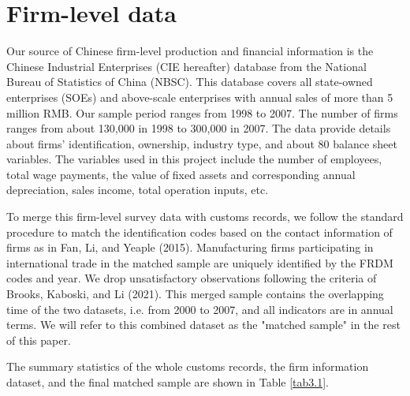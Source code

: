 \section{Firm-level data}

Our source of Chinese firm-level production and financial information is the Chinese Industrial Enterprises (CIE hereafter) database from the National Bureau of Statistics of China (NBSC). This database covers all state-owned enterprises (SOEs) and above-scale enterprises with annual sales of more than 5 million RMB. Our sample period ranges from 1998 to 2007. The number of firms ranges from about 130,000 in 1998 to 300,000 in 2007. The data provide details about firms’ identification, ownership, industry type, and about 80 balance sheet variables. The variables used in this project include the number of employees, total wage payments, the value of fixed assets and corresponding annual depreciation, sales income, total operation inputs, etc. 

To merge this firm-level survey data with customs records, we follow the standard procedure to match the identification codes based on the contact information of firms as in Fan, Li, and Yeaple (2015)\cite{fan-li-yeaple2015}. Manufacturing firms participating in international trade in the matched sample are uniquely identified by the FRDM codes and year. We drop unsatisfactory observations following the criteria of Brooks, Kaboski, and Li (2021)\cite{bkl2021}. This merged sample contains the overlapping time of the two datasets, i.e. from 2000 to 2007, and all indicators are in annual terms. We will refer to this combined dataset as the "matched sample" in the rest of this paper.

The summary statistics of the whole customs records, the firm information dataset, and the final matched sample are shown in Table \ref{tab3.1}.

